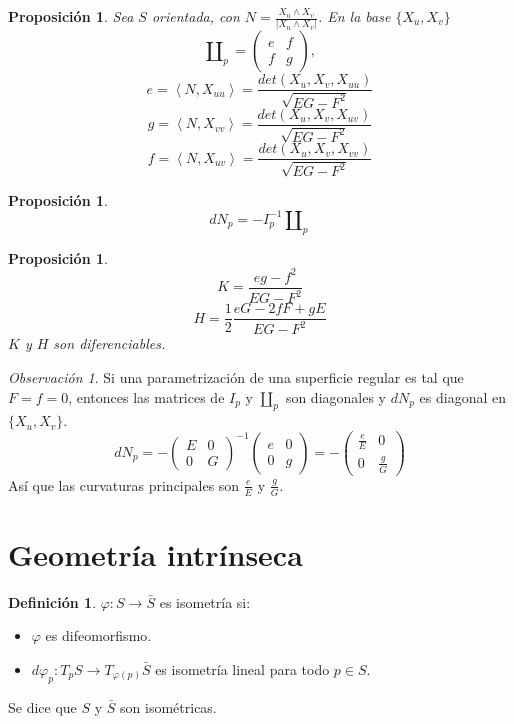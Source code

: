 \documentclass{report}
\newtheorem{proposition}[theorem]{Proposición}
\theoremstyle{remark}
\newtheorem*{remark}{Observación}
\theoremstyle{remark}
\theoremstyle{definition}
\newtheorem{definition}{Definición}[chapter]
\theoremstyle{definition}
\theoremstyle{definition}
\begin{document}
\begin{proposition}
    Sea $S$ orientada, con $N = \frac{X_u \land X_v}{|X_u \land X_v|}$. En la base $\{ X_u, X_v \}$
    $$\amalg_p =
        \begin{pmatrix}
            e & f \\
            f & g
        \end{pmatrix},$$
    $$e = \left\langle N, X_{uu} \right\rangle = \frac{det(X_u, X_v, X_{uu})}{\sqrt{EG-F^2}}$$
    $$g = \left\langle N, X_{vv} \right\rangle = \frac{det(X_u, X_v, X_{uv})}{\sqrt{EG-F^2}}$$
    $$f = \left\langle N, X_{uv} \right\rangle = \frac{det(X_u, X_v, X_{vv})}{\sqrt{EG-F^2}}$$
\end{proposition}

\begin{proposition}
    $$dN_p = -I_p^{-1} \amalg_p$$
\end{proposition}

\begin{proposition}
    $$K = \frac{eg-f^2}{EG-F^2}$$
    $$H = \frac{1}{2} \frac{eG - 2fF + gE}{EG-F^2}$$
    $K$ y $H$ son diferenciables.
\end{proposition}

\begin{remark}
    Si una parametrización de una superficie regular es tal que $F = f = 0$, entonces las matrices de $I_p$ y $\amalg_p$ son diagonales y $dN_p$ es diagonal en $\{X_u, X_v\}$.
    $$dN_p = -
        \begin{pmatrix}
            E & 0 \\
            0 & G
        \end{pmatrix}^{-1}
        \begin{pmatrix}
            e & 0 \\
            0 & g
        \end{pmatrix} = -
        \begin{pmatrix}
            \frac{e}{E} & 0           \\
            0           & \frac{g}{G}
        \end{pmatrix}$$
    Así que las curvaturas principales son $\frac{e}{E}$ y $\frac{g}{G}$.
\end{remark}

\section{Geometría intrínseca}

\begin{definition}
    $\varphi : S \to \bar{S}$ es isometría si:
    \begin{itemize}
        \item $\varphi$ es difeomorfismo.
        \item $d\varphi_p : T_pS \to T_{\varphi(p)}\bar{S}$ es isometría lineal para todo $p \in S$.
    \end{itemize}
    Se dice que $S$ y $\bar{S}$ son isométricas.
\end{definition}
\end{document}
